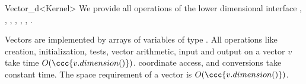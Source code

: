 \begin{ccRefClass}{Vector_d<Kernel>}
 We provide all operations of the
lower dimensional interface , , ,
, , , .



\ccImplementation

Vectors are implemented by arrays of variables of type .  All
operations like creation, initialization, tests, vector arithmetic,
input and output on a vector $v$ take time $O(\ccc{v.dimension()})$.
coordinate access,  and conversions take constant
time.  The space requirement of a vector is $O(\ccc{v.dimension()})$.


\end{ccRefClass}


